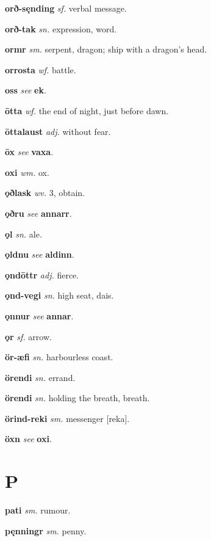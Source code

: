 \documentclass[12pt,letterpaper]{book}
\newcommand\emptypage{\clearpage{\pagestyle{empty}\cleardoublepage}}
\begin{document}
\noindent
\textbf{orð-sęnding} \textit{sf.} verbal message.

\noindent
\textbf{orð-tak} \textit{sn.} expression, word.

\noindent
\textbf{ormr} \textit{sm.} serpent, dragon; ship with a dragon's head.

\noindent
\textbf{orrosta} \textit{wf.} battle.

\noindent
\textbf{oss} \textit{} \textit{see} \textbf{ek}.

\noindent
\textbf{ōtta} \textit{wf.} the end of night, just before dawn.

\noindent
\textbf{ōttalaust} \textit{adj.} without fear.

\noindent
\textbf{ōx} \textit{} \textit{see} \textbf{vaxa}.

\noindent
\textbf{oxi} \textit{wm.} ox.

\noindent
\textbf{ǫðlask} \textit{wv.} 3, obtain.

\noindent
\textbf{ǫðru} \textit{} \textit{see} \textbf{annarr}.

\noindent
\textbf{ǫl} \textit{sn.} ale.

\noindent
\textbf{ǫldnu} \textit{} \textit{see} \textbf{aldinn}.

\noindent
\textbf{ǫndōttr} \textit{adj.} fierce.

\noindent
\textbf{ǫnd-vegi} \textit{sn.} high seat, dais.

\noindent
\textbf{ǫnnur} \textit{} \textit{see} \textbf{annar}.

\noindent
\textbf{ǫr} \textit{sf.} arrow.

\noindent
\textbf{ör-æfi} \textit{sn.} harbourless coast.

\noindent
\textbf{örendi} \textit{sn.} errand.

\noindent
\textbf{örendi} \textit{sn.} holding the breath, breath.

\noindent
\textbf{örind-reki} \textit{sm.} messenger [reka].

\noindent
\textbf{öxn} \textit{} \textit{see} \textbf{oxi}.

\emptypage

\chapter*{P}

\noindent
\textbf{pati} \textit{sm.} rumour.

\noindent
\textbf{pęnningr} \textit{sm.} penny.
\end{document}
